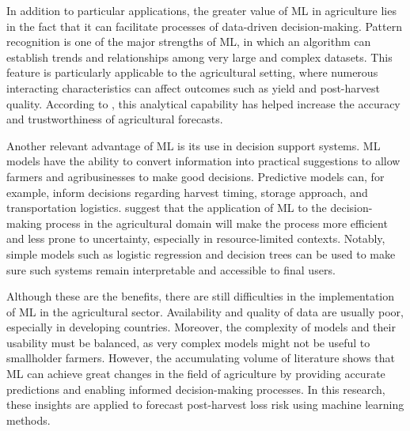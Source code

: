 In addition to particular applications, the greater value of ML in agriculture lies in the fact that
it can facilitate processes of data-driven decision-making. Pattern recognition is one of the major
strengths of ML, in which an algorithm can establish trends and relationships among very large and
complex datasets. This feature is particularly applicable to the agricultural setting, where numerous
interacting characteristics can affect outcomes such as yield and post-harvest quality. According to
\cite{jabed2024crop}, this analytical capability has helped increase the accuracy and trustworthiness
of agricultural forecasts.

Another relevant advantage of ML is its use in decision support systems. ML models have the ability
to convert information into practical suggestions to allow farmers and agribusinesses to make good
decisions. Predictive models can, for example, inform decisions regarding harvest timing, storage
approach, and transportation logistics. \cite{meghraoui2024applied} suggest that the application of
ML to the decision-making process in the agricultural domain will make the process more efficient
and less prone to uncertainty, especially in resource-limited contexts. Notably, simple models such
as logistic regression and decision trees can be used to make sure such systems remain interpretable
and accessible to final users.

Although these are the benefits, there are still difficulties in the implementation of ML in the
agricultural sector. Availability and quality of data are usually poor, especially in developing
countries. Moreover, the complexity of models and their usability must be balanced, as very complex
models might not be useful to smallholder farmers. However, the accumulating volume of literature
shows that ML can achieve great changes in the field of agriculture by providing accurate
predictions and enabling informed decision-making processes. In this research, these insights are
applied to forecast post-harvest loss risk using machine learning methods.
